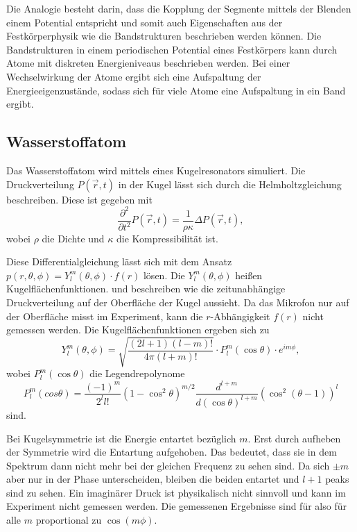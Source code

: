 Die Analogie besteht darin, dass die Kopplung der Segmente mittels der Blenden einem Potential entspricht und somit auch Eigenschaften aus der Festkörperphysik wie die Bandstrukturen beschrieben werden können. 
Die Bandstrukturen in einem periodischen Potential eines Festkörpers kann durch Atome mit diskreten Energieniveaus beschrieben werden. Bei einer Wechselwirkung der Atome ergibt sich eine Aufspaltung der Energieeigenzustände, sodass sich für viele Atome eine Aufspaltung in ein Band ergibt. 


\subsection{Wasserstoffatom}
\label{sec:Wasserstoff}
Das Wasserstoffatom wird mittels eines Kugelresonators simuliert. Die Druckverteilung $P(\vec r,t)$ in der Kugel lässt sich durch die Helmholtzgleichung beschreiben. 
Diese ist gegeben mit 
\begin{equation*}
    \frac{\partial^2}{\partial t^2} P(\vec r,t) = \frac{1}{\rho\kappa} \Delta P(\vec r,t),
\end{equation*}
wobei $\rho$ die Dichte und $\kappa$ die Kompressibilität ist. 

Diese Differentialgleichung lässt sich mit dem Ansatz $p(r, \theta, \phi) = Y^m_l(\theta, \phi) \cdot f(r)$ lösen.
Die $Y^m_l(\theta, \phi)$ heißen Kugelflächenfunktionen. und beschreiben wie die zeitunabhängige Druckverteilung auf der Oberfläche der Kugel aussieht. 
Da das Mikrofon nur auf der Oberfläche misst im Experiment, kann die $r$-Abhängigkeit $f(r)$ nicht gemessen werden. 
Die Kugelflächenfunktionen ergeben sich zu 
\begin{equation*}
    Y^m_l (\theta, \phi) = \sqrt{\frac{(2l+1)(l-m)!}{4\pi(l+m)!}} \cdot P^m_l(\cos \theta) \cdot e^{i m \phi},
\end{equation*}
wobei $P^m_l(\cos \theta)$ die Legendrepolynome 
\begin{equation*}
P^m_l(cos \theta) = \frac{(-1)^m}{2^l l!} (1- \cos^2 \theta)^{m/2} \frac{d^{l+m}}{d(\cos \theta)^{l+m}} (\cos^2 (\theta -1))^l
\end{equation*}
sind.

Bei Kugelsymmetrie ist die Energie entartet bezüglich $m$. 
Erst durch aufheben der Symmetrie wird die Entartung aufgehoben.  
Das bedeutet, dass sie in dem Spektrum dann nicht mehr bei der gleichen Frequenz zu sehen sind. Da sich $\pm m$ aber nur in der Phase unterscheiden, bleiben die beiden entartet und $l+1$ peaks sind zu sehen. 
Ein imaginärer Druck ist physikalisch nicht sinnvoll und kann im Experiment nicht gemessen werden. Die gemessenen Ergebnisse sind für also für alle $m$ proportional zu $\cos(m\phi)$. 

